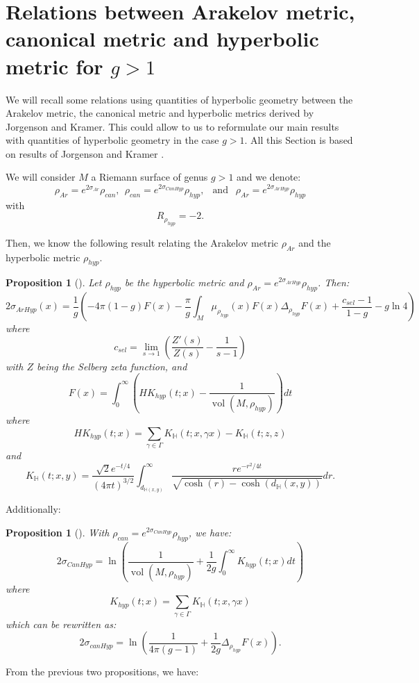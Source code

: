 \documentclass{article}
\newtheorem{Proposition}[theorem]{Proposition}
\theoremstyle{definition}
\theoremstyle{remark}
\DeclareMathOperator{\vol}{vol}
\begin{document}
\section{Relations between Arakelov metric, canonical metric and hyperbolic metric for $g>1$}\label{AnnexeArakelovHyperbolic}
We will recall some relations using quantities of hyperbolic geometry between the Arakelov metric, the canonical metric and hyperbolic metrics derived by Jorgenson and Kramer. This could allow to us to reformulate our main results with quantities of hyperbolic geometry in the case $g>1$. All this Section is based on results of Jorgenson and Kramer \cite{Jorgenson2006NoncompletenessOT, JorgensonBoundsFaltings}.

We will consider $M$ a Riemann surface of genus $g>1$ and we denote: $$\rho_{Ar}=e^{2\sigma_{Ar}}\rho_{can},~~ \rho_{can}=e^{2\sigma_{CanHyp}}\rho_{hyp}, ~~ \text{ and } ~~ \rho_{Ar}=e^{2\sigma_{ArHyp}}\rho_{hyp}$$
with $$R_{\rho_{hyp}}=-2.$$

Then, we know the following result relating the Arakelov metric $\rho_{Ar}$ and the hyperbolic metric $\rho_{hyp}$.

\begin{Proposition}[{\cite[eq. (3)]{Jorgenson2006NoncompletenessOT}}]
    Let $\rho_{hyp}$ be the hyperbolic metric and $\rho_{Ar}=e^{2\sigma_{ArHyp}} \rho_{hyp}$. Then:
    $$2\sigma_{ArHyp}(x)=\frac{1}{g} \left(-4\pi(1-g)F(x)-\frac{\pi}{g}\int_{M}\mu_{\rho_{hyp}}(x)F(x)\Delta_{\rho_{hyp}}F(x) +\frac{c_{sel}-1}{1-g}-g\ln4\right)$$
    where
    $$c_{sel}=\lim_{s \to 1} \left(\frac{Z'(s)}{Z(s)}-\frac{1}{s-1} \right)$$
    with $Z$ being the Selberg zeta function, and
    $$F(x)=\int_{0}^{\infty}\left(HK_{hyp}(t;x) -\frac{1}{\vol(M,\rho_{hyp})}\right)dt$$
    where
    $$HK_{hyp}(t;x)=\sum_{\gamma \in \Gamma}K_{\mathbb{H}}(t;x,\gamma x)-K_{\mathbb{H}}(t;z,z)$$
    and
    $$K_{\mathbb{H}}(t;x,y)=\frac{\sqrt{2}e^{-t/4}}{(4\pi t)^{3/2}}\int_{d_{\mathbb{H}(x,y)}}^{\infty}\frac{re^{-r^{2}/4t}}{\sqrt{\cosh(r)-\cosh(d_{\mathbb{H}}(x,y))}}dr.$$
\end{Proposition}

Additionally:

\begin{Proposition} [{\cite[eq. (29)]{JorgensonBoundsFaltings}}]
    With $\rho_{can}=e^{2\sigma_{CanHyp}}\rho_{hyp}$, we have:
    $$2\sigma_{CanHyp}=\ln\left(\frac{1}{\vol(M,\rho_{hyp})}+\frac{1}{2g}\int_{0}^{\infty}K_{hyp}(t;x)dt\right)$$
    where
    $$K_{hyp}(t;x)=\sum_{\gamma \in \Gamma} K_{\mathbb{H}}(t;x,\gamma x)$$
    which can be rewritten as:
    $$2\sigma_{canHyp}=\ln \left(\frac{1}{4\pi(g-1)}+\frac{1}{2g}\Delta_{\rho_{hyp}}F(x) \right).$$
\end{Proposition}
    From the previous two propositions, we have:
\end{document}
